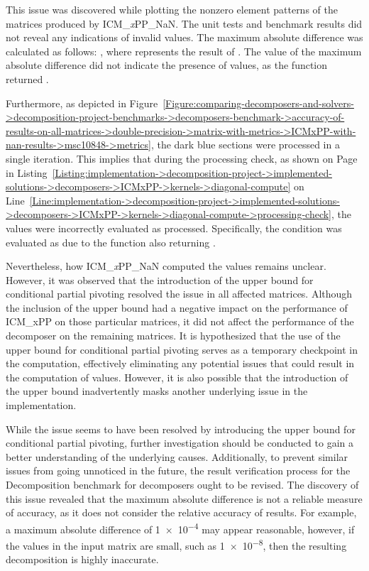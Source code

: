 This issue was discovered while plotting the nonzero element patterns of the  matrices produced by ICM\_\textit{x}PP\_NaN. The unit tests and benchmark results did not reveal any indications of invalid values. The maximum absolute difference was calculated as follows: , where  represents the result of . The value of the maximum absolute difference did not indicate the presence of  values, as the  function returned .

Furthermore, as depicted in Figure~\ref{Figure:comparing-decomposers-and-solvers->decomposition-project-benchmarks->decomposers-benchmark->accuracy-of-results-on-all-matrices->double-precision->matrix-with-metrics->ICMxPP-with-nan-results->msc10848->metrics}, the dark blue sections were processed in a single iteration. This implies that during the processing check, as shown on
Page~\pageref{Listing:implementation->decomposition-project->implemented-solutions->decomposers->ICMxPP->kernels->diagonal-compute} in Listing~\ref{Listing:implementation->decomposition-project->implemented-solutions->decomposers->ICMxPP->kernels->diagonal-compute} on Line~\ref{Line:implementation->decomposition-project->implemented-solutions->decomposers->ICMxPP->kernels->diagonal-compute->processing-check}, the  values were incorrectly evaluated as processed. Specifically, the condition  was evaluated as  due to the  function also returning .

Nevertheless, how ICM\_\textit{x}PP\_NaN computed the  values remains unclear. However, it was observed that the introduction of the upper bound for conditional partial pivoting resolved the issue in all affected matrices. Although the inclusion of the upper bound had a negative impact on the performance of ICM\_xPP on those particular matrices, it did not affect the performance of the decomposer on the remaining matrices. It is hypothesized that the use of the upper bound for conditional partial pivoting serves as a temporary checkpoint in the computation, effectively eliminating any potential issues that could result in the computation of  values. However, it is also possible that the introduction of the upper bound inadvertently masks another underlying issue in the implementation.

While the issue seems to have been resolved by introducing the upper bound for conditional partial pivoting, further investigation should be conducted to gain a better understanding of the underlying causes. Additionally, to prevent similar issues from going unnoticed in the future, the result verification process for the Decomposition benchmark for decomposers ought to be revised. The discovery of this issue revealed that the maximum absolute difference is not a reliable measure of accuracy, as it does not consider the relative accuracy of results. For example, a maximum absolute difference of \num{1e-4} may appear reasonable, however, if the values in the input matrix are small, such as \num{1e-8}, then the resulting decomposition is highly inaccurate.

